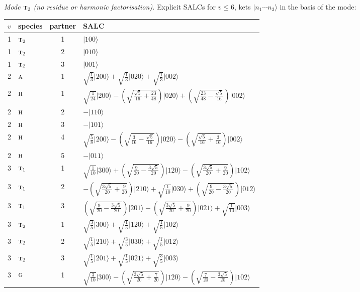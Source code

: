 \documentclass[11pt]{article}
\newcommand{\irr}[1]{\text{\normalfont\scshape #1}}
\newcommand{\occ}[1]{\lvert #1\rangle}
\begin{document}
\emph{Mode $\irr{t}_{2}$ (no residue or harmonic factorisation).} Explicit SALCs for $v\le6$, kets $\occ{n_1\cdots n_{3}}$ in the basis of the mode:
\begin{longtable}{c l c p{}}\hline $v$ & species & partner & SALC\\ \hline\endhead
1 & $\irr{t}_{2}$ & 1 & $\occ{100}$\\
1 & $\irr{t}_{2}$ & 2 & $\occ{010}$\\
1 & $\irr{t}_{2}$ & 3 & $\occ{001}$\\
\hline
2 & $\irr{a}$ & 1 & $\sqrt{\tfrac{1}{3}}\occ{200}+\sqrt{\tfrac{1}{3}}\occ{020}+\sqrt{\tfrac{1}{3}}\occ{002}$\\
2 & $\irr{h}$ & 1 & $\sqrt{\tfrac{1}{24}}\occ{200}-(\sqrt{\frac{\sqrt{5}}{16} + \frac{23}{48}})\occ{020}+(\sqrt{\frac{23}{48} - \frac{\sqrt{5}}{16}})\occ{002}$\\
2 & $\irr{h}$ & 2 & $-\occ{110}$\\
2 & $\irr{h}$ & 3 & $-\occ{101}$\\
2 & $\irr{h}$ & 4 & $\sqrt{\tfrac{5}{8}}\occ{200}-(\sqrt{\frac{3}{16} - \frac{\sqrt{5}}{16}})\occ{020}-(\sqrt{\frac{\sqrt{5}}{16} + \frac{3}{16}})\occ{002}$\\
2 & $\irr{h}$ & 5 & $-\occ{011}$\\
\hline
3 & $\irr{t}_{1}$ & 1 & $\sqrt{\tfrac{1}{10}}\occ{300}+(\sqrt{\frac{9}{20} - \frac{3 \sqrt{5}}{20}})\occ{120}-(\sqrt{\frac{3 \sqrt{5}}{20} + \frac{9}{20}})\occ{102}$\\
3 & $\irr{t}_{1}$ & 2 & $-(\sqrt{\frac{3 \sqrt{5}}{20} + \frac{9}{20}})\occ{210}+\sqrt{\tfrac{1}{10}}\occ{030}+(\sqrt{\frac{9}{20} - \frac{3 \sqrt{5}}{20}})\occ{012}$\\
3 & $\irr{t}_{1}$ & 3 & $(\sqrt{\frac{9}{20} - \frac{3 \sqrt{5}}{20}})\occ{201}-(\sqrt{\frac{3 \sqrt{5}}{20} + \frac{9}{20}})\occ{021}+\sqrt{\tfrac{1}{10}}\occ{003}$\\
3 & $\irr{t}_{2}$ & 1 & $\sqrt{\tfrac{3}{5}}\occ{300}+\sqrt{\tfrac{1}{5}}\occ{120}+\sqrt{\tfrac{1}{5}}\occ{102}$\\
3 & $\irr{t}_{2}$ & 2 & $\sqrt{\tfrac{1}{5}}\occ{210}+\sqrt{\tfrac{3}{5}}\occ{030}+\sqrt{\tfrac{1}{5}}\occ{012}$\\
3 & $\irr{t}_{2}$ & 3 & $\sqrt{\tfrac{1}{5}}\occ{201}+\sqrt{\tfrac{1}{5}}\occ{021}+\sqrt{\tfrac{3}{5}}\occ{003}$\\
3 & $\irr{g}$ & 1 & $\sqrt{\tfrac{3}{10}}\occ{300}-(\sqrt{\frac{3 \sqrt{5}}{20} + \frac{7}{20}})\occ{120}-(\sqrt{\frac{7}{20} - \frac{3 \sqrt{5}}{20}})\occ{102}$\\

\end{longtable}
\end{document}
